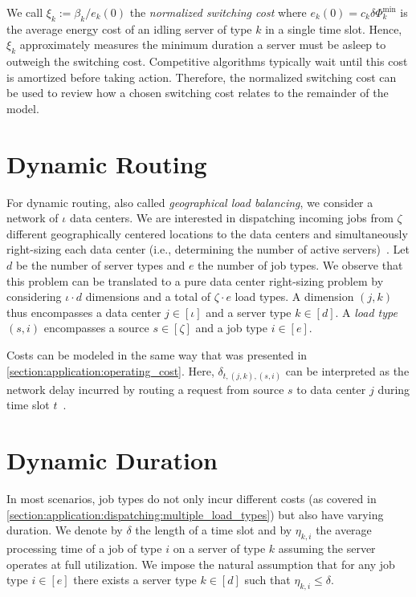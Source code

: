 We call $\xi_k := \beta_k / e_k(0)$ the \emph{normalized switching cost} where $e_k(0) = c_k \delta \Phi_k^{\text{min}}$ is the average energy cost of an idling server of type $k$ in a single time slot. Hence, $\xi_k$ approximately measures the minimum duration a server must be asleep to outweigh the switching cost. Competitive algorithms typically wait until this cost is amortized before taking action. Therefore, the normalized switching cost can be used to review how a chosen switching cost relates to the remainder of the model.

\section{Dynamic Routing}\label{section:application:dynamic_routing}

For dynamic routing, also called \emph{geographical load balancing}, we consider a network of $\iota$ data centers. We are interested in dispatching incoming jobs from $\zeta$ different geographically centered locations to the data centers and simultaneously right-sizing each data center (i.e., determining the number of active servers)~\cite{Lin2012}. Let $d$ be the number of server types and $e$ the number of job types. We observe that this problem can be translated to a pure data center right-sizing problem by considering $\iota \cdot d$ dimensions and a total of $\zeta \cdot e$ load types. A dimension $(j,k)$ thus encompasses a data center $j \in [\iota]$ and a server type $k \in [d]$. A \emph{load type} $(s,i)$ encompasses a source $s \in [\zeta]$ and a job type $i \in [e]$.

Costs can be modeled in the same way that was presented in \cref{section:application:operating_cost}. Here, $\delta_{t,(j,k),(s,i)}$ can be interpreted as the network delay incurred by routing a request from source $s$ to data center $j$ during time slot $t$~\cite{Lin2012}.

\section{Dynamic Duration}\label{section:application:dynamic_duration}

In most scenarios, job types do not only incur different costs (as covered in \cref{section:application:dispatching:multiple_load_types}) but also have varying duration. We denote by $\delta$ the length of a time slot and by $\eta_{k,i}$ the average processing time of a job of type $i$ on a server of type $k$ assuming the server operates at full utilization. We impose the natural assumption that for any job type $i \in [e]$ there exists a server type $k \in [d]$ such that $\eta_{k,i} \leq \delta$.

